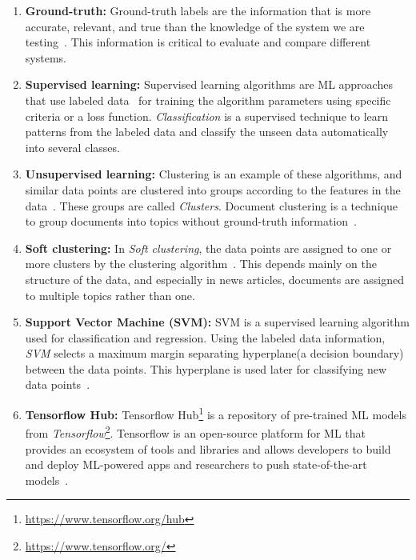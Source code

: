 \documentclass[master,proposal,extern,palatino]{rgseThesis}
\begin{document}
\begin{enumerate}
	
\item{\textbf{Ground-truth:}} Ground-truth labels are the information that is more accurate, relevant, and true than the knowledge of the system we are testing~\cite{cardoso2014gold}. This information is critical to evaluate and compare different systems.

\item{\textbf{Supervised learning:}} Supervised learning algorithms are ML approaches that use labeled data~\cite{9155761} for training the algorithm parameters using specific criteria or a loss function. \textit{Classification} is a supervised technique to learn patterns from the labeled data and classify the unseen data automatically into several classes. 
   
\item{\textbf{Unsupervised learning:}} Clustering is an example
of these algorithms, and similar data points are clustered into groups according to the
features in the data~\cite{mahesh2020machine}. These groups are called \textit{Clusters}. Document clustering is a technique to group documents into topics without ground-truth information~\cite{de2012document}.

\item{\textbf{Soft clustering:}} In \textit{Soft clustering}, the data points are assigned to one or more clusters by the clustering algorithm~\cite{de2012document}. This depends mainly on the structure of the data, and especially in news articles, documents are assigned to multiple topics rather than one.

\item{\textbf{Support Vector Machine (SVM):}} SVM is a supervised learning algorithm used for classification and regression. Using the labeled data information, \textit{SVM} selects a maximum margin separating hyperplane(a decision boundary) between the data points. This hyperplane is used later for classifying new data points~\cite{noble2006support}. 

\item{\textbf{Tensorflow Hub:}} Tensorflow Hub\footnote{\url{https://www.tensorflow.org/hub}} is a repository of pre-trained ML models from \textit{Tensorflow}\footnote{\url{https://www.tensorflow.org/}}. Tensorflow is an open-source platform for ML that provides an ecosystem of
tools and libraries and allows developers to build and deploy ML-powered apps and
researchers to push state-of-the-art models~\cite{tensorflow_developers_2022_6574269}. 

\end{enumerate}	
\end{document}

